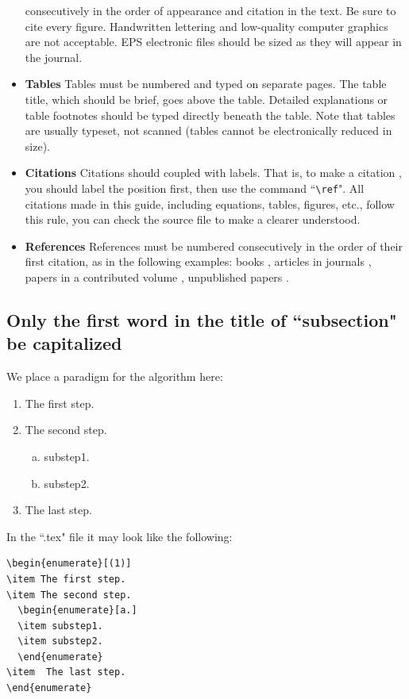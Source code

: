 \documentclass[print]{jicspack}
\begin{document}
\begin{itemize}
consecutively in the order of appearance and citation in the text.
Be sure to cite every figure. Handwritten lettering and
low-quality computer graphics are not acceptable. EPS electronic
files should be sized as they will appear in the journal.
\item{\bf Tables} Tables must be numbered and typed on separate
pages. The table title, which should be brief, goes above the
table. Detailed explanations or table footnotes should be typed
directly beneath the table. Note that tables are usually typeset,
not scanned (tables cannot be electronically reduced in size).
\item{\bf Citations} Citations should coupled with labels. That
is, to make a citation , you should label the position first, then
use the command ``\verb|\ref|". All citations made in this guide,
including equations, tables, figures, etc., follow this rule, you
can check the source file to make a clearer understood. \item{\bf
References} References must be numbered consecutively in the order
of their first citation, as in the following examples: books
\cite{NumeApp,texbook}, articles in journals \cite{UncaliEu},
papers in a contributed volume \cite{Deformation,canonical},
unpublished papers \cite{SpaceDeform}.
\end{itemize}
\subsection{Only the first word in the title of ``subsection" be capitalized}
\label{sec:1.1}
We place a paradigm for the algorithm here:
\begin{enumerate}[(1)]
\item The first step.
\item The second step.
  \begin{enumerate}[a.]
  \item substep1.
  \item substep2.
  \end{enumerate}
\item  The last step.
\end{enumerate}
In the ``.tex" file it may look like the following:
\begin{verbatim}
\begin{enumerate}[(1)]
\item The first step.
\item The second step.
  \begin{enumerate}[a.]
  \item substep1.
  \item substep2.
  \end{enumerate}
\item  The last step.
\end{enumerate}
\end{verbatim}
\end{document}

